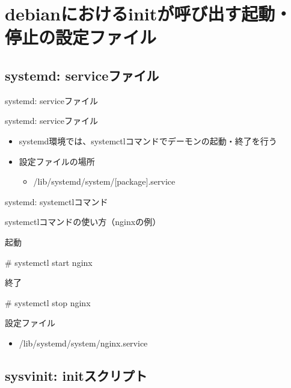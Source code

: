 \section{debianにおけるinitが呼び出す起動・停止の設定ファイル}

\subsection{systemd: serviceファイル}

\begin{frame}
  \begin{center}\Huge{systemd: serviceファイル}\end{center}
\end{frame} 

\begin{frame}[containsverbatim]{systemd: serviceファイル}
  \begin{itemize}
  \item systemd環境では、systemctlコマンドでデーモンの起動・終了を行う
  \item 設定ファイルの場所
    \begin{itemize}
      \item /lib/systemd/system/[package].service
    \end{itemize}
  \end{itemize}
\end{frame}


\begin{frame}[containsverbatim]{systemd: systemctlコマンド}

systemctlコマンドの使い方（nginxの例）

起動
\begin{commandline}
# systemctl start nginx
\end{commandline}

終了
\begin{commandline}
# systemctl stop nginx
\end{commandline}

設定ファイル
\begin{itemize}
\item /lib/systemd/system/nginx.service
\end{itemize}
    
\end{frame}


\subsection{sysvinit: initスクリプト}

